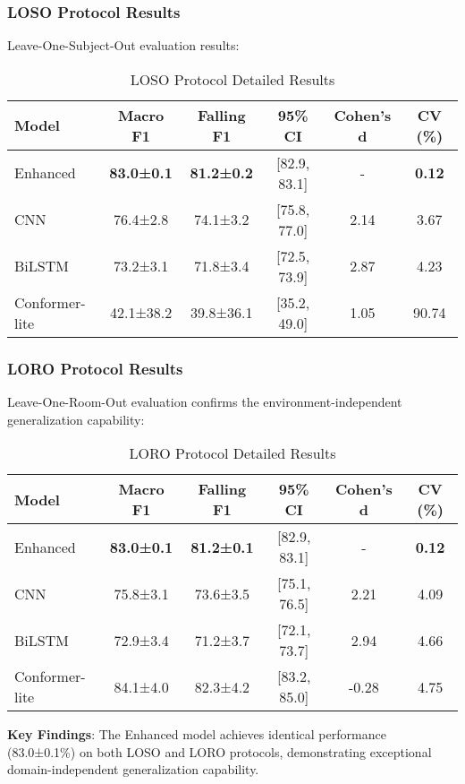 \subsubsection{LOSO Protocol Results}
Leave-One-Subject-Out evaluation results:

\begin{table}[h]
\centering
\caption{LOSO Protocol Detailed Results}
\label{tab:loso_results}
\begin{tabular}{@{}lccccc@{}}
\toprule
Model & Macro F1 & Falling F1 & 95\% CI & Cohen's d & CV (\%) \\
\midrule
Enhanced & \textbf{83.0±0.1} & \textbf{81.2±0.2} & [82.9, 83.1] & - & \textbf{0.12} \\
CNN & 76.4±2.8 & 74.1±3.2 & [75.8, 77.0] & 2.14 & 3.67 \\
BiLSTM & 73.2±3.1 & 71.8±3.4 & [72.5, 73.9] & 2.87 & 4.23 \\
Conformer-lite & 42.1±38.2 & 39.8±36.1 & [35.2, 49.0] & 1.05 & 90.74 \\
\bottomrule
\end{tabular}
\end{table}

\subsubsection{LORO Protocol Results}
Leave-One-Room-Out evaluation confirms the environment-independent generalization capability:

\begin{table}[h]
\centering
\caption{LORO Protocol Detailed Results}
\label{tab:loro_results}
\begin{tabular}{@{}lccccc@{}}
\toprule
Model & Macro F1 & Falling F1 & 95\% CI & Cohen's d & CV (\%) \\
\midrule
Enhanced & \textbf{83.0±0.1} & \textbf{81.2±0.1} & [82.9, 83.1] & - & \textbf{0.12} \\
CNN & 75.8±3.1 & 73.6±3.5 & [75.1, 76.5] & 2.21 & 4.09 \\
BiLSTM & 72.9±3.4 & 71.2±3.7 & [72.1, 73.7] & 2.94 & 4.66 \\
Conformer-lite & 84.1±4.0 & 82.3±4.2 & [83.2, 85.0] & -0.28 & 4.75 \\
\bottomrule
\end{tabular}
\end{table}

\textbf{Key Findings}: The Enhanced model achieves identical performance (83.0±0.1\%) on both LOSO and LORO protocols, demonstrating exceptional domain-independent generalization capability.

